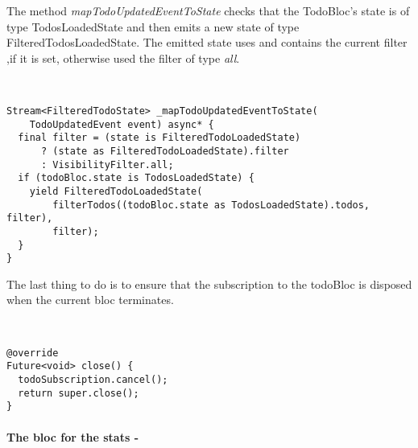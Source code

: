 The method \textit{mapTodoUpdatedEventToState} checks that the TodoBloc’s state is of type TodosLoadedState and then emits a new state of type FilteredTodosLoadedState. The emitted state uses and contains the current filter ,if it is set, otherwise used the filter of type \textit{all}.
\begin{code}
\mbox{}\\
 \mbox{}
\label{code:2.14}
\begin{verbatim}
Stream<FilteredTodoState> _mapTodoUpdatedEventToState(
    TodoUpdatedEvent event) async* {
  final filter = (state is FilteredTodoLoadedState)
      ? (state as FilteredTodoLoadedState).filter
      : VisibilityFilter.all;
  if (todoBloc.state is TodosLoadedState) {
    yield FilteredTodoLoadedState(
        filterTodos((todoBloc.state as TodosLoadedState).todos, filter),
        filter);
  }
}
\end{verbatim}
\mbox{}
\end{code}

The last thing to do is to ensure that the subscription to the todoBloc is disposed when the current bloc terminates.
\begin{code}
\mbox{}\\
 \mbox{}
\label{code:2.14}
\begin{verbatim}
@override
Future<void> close() {
  todoSubscription.cancel();
  return super.close();
}
\end{verbatim}
\mbox{}
\end{code}


\paragraph{The bloc for the stats - }
\label{subpar:todo_app_bloc_core_state}

